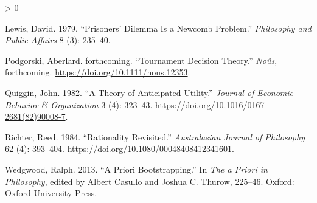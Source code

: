 \documentclass[
  12pt,
]{article}
\newlength{\cslhangindent}
\newenvironment{CSLReferences}[2] %
 {%
  \setlength{\parindent}{0pt}
  \ifodd #1 \everypar{\setlength{\hangindent}{\cslhangindent}}\ignorespaces\fi
  \ifnum #2 > 0
  \setlength{\parskip}{#2\baselineskip}
  \fi
 }%
 {}
\begin{document}
\begin{CSLReferences}{1}{0}
\leavevmode\hypertarget{ref-Lewis1979e}{}%
Lewis, David. 1979. {``Prisoners' Dilemma Is a {N}ewcomb Problem.''}
\emph{Philosophy and Public Affairs} 8 (3): 235--40.

\leavevmode\hypertarget{ref-Podgorski2022}{}%
Podgorski, Aberlard. forthcoming. {``Tournament Decision Theory.''}
\emph{No{û}s}, forthcoming. \url{https://doi.org/10.1111/nous.12353}.

\leavevmode\hypertarget{ref-Quiggin1982}{}%
Quiggin, John. 1982. {``A Theory of Anticipated Utility.''}
\emph{Journal of Economic Behavior \& Organization} 3 (4): 323--43.
\url{https://doi.org/10.1016/0167-2681(82)90008-7}.

\leavevmode\hypertarget{ref-Richter1984}{}%
Richter, Reed. 1984. {``Rationality Revisited.''} \emph{Australasian
Journal of Philosophy} 62 (4): 393--404.
\url{https://doi.org/10.1080/00048408412341601}.

\leavevmode\hypertarget{ref-Wedgwood2013}{}%
Wedgwood, Ralph. 2013. {``A Priori Bootstrapping.''} In \emph{The a
Priori in Philosophy}, edited by Albert Casullo and Joshua C. Thurow,
225--46. Oxford: Oxford University Press.

\end{CSLReferences}
\end{document}
